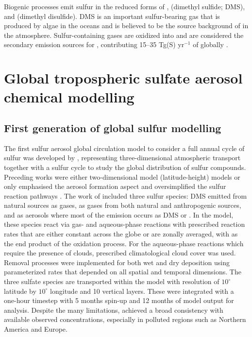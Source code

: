 Biogenic processes emit sulfur in the reduced forms of ,  (dimethyl sulfide; DMS), and  (dimethyl disulfide). DMS is an important sulfur-bearing gas that is produced by algae in the oceans and is believed to be the source background of  in the atmosphere. Sulfur-containing gases are oxidized into  and are considered the secondary emission sources for , contributing 15--35 Tg(S) yr$^{-1}$ of  globally \citep{lanaUpdatedClimatologySurface2011}.


\section{Global tropospheric sulfate aerosol chemical modelling} %
\label{section1.2}

\subsection{First generation of global sulfur modelling}

The first sulfur aerosol global circulation model to consider a full annual cycle of sulfur was developed by \citet{langnerGlobalThreedimensionalModel1991}, representing three-dimensional atmospheric transport together with a sulfur cycle to study the global distribution of sulfur compounds. Preceding works were either two-dimensional model (latitude-height) models \citep{rodheGlobalDistributionSulfur1980} or only emphasised the aerosol formation aspect and oversimplified the sulfur reaction pathways \citep{ericksoniiiGlobalOceantoatmosphereDimethyl1990}. The work of \citet{langnerGlobalThreedimensionalModel1991} included three sulfur species: DMS emitted from natural sources as gases,  as gases from both natural and anthropogenic sources, and  as aerosols where most of the emission occurs as DMS or . In the model, these species react via gas- and aqueous-phase reactions with prescribed reaction rates that are either constant across the globe or are zonally averaged, with  as the end product of the oxidation process. For the aqueous-phase reactions which require the presence of clouds, prescribed climatological cloud cover was used. Removal processes were implemented for both wet and dry deposition using parameterized rates that depended on all spatial and temporal dimensions. The three sulfate species are transported within the model with resolution of $10^\circ$ latitude by $10^\circ$ longitude and 10 vertical layers. These were integrated with a one-hour timestep with 5 months spin-up and 12 months of model output for analysis. Despite the many limitations, \citet{langnerGlobalThreedimensionalModel1991} achieved a broad consistency with available observed concentrations, especially in polluted regions such as Northern America and Europe.

